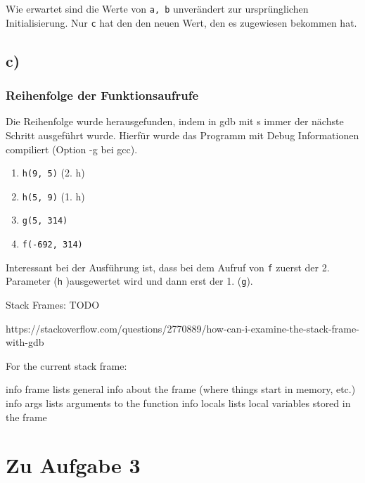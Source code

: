 \documentclass[12pt]{article}
\begin{document}
Wie erwartet sind die Werte von \texttt{a, b} unverändert zur ursprünglichen Initialisierung. Nur \texttt{c} hat den den neuen Wert, den es zugewiesen bekommen hat.

\subsection{c)}

\subsubsection{Reihenfolge der Funktionsaufrufe}

Die Reihenfolge wurde herausgefunden, indem in gdb mit s immer der nächste Schritt ausgeführt wurde. Hierfür wurde das Programm mit Debug Informationen compiliert (Option -g bei gcc).


\begin{enumerate}
\item \texttt{h(9, 5)} (2. h)
\item \texttt{h(5, 9)} (1. h)
\item \texttt{g(5, 314)}
\item \texttt{f(-692, 314)}
\end{enumerate}

Interessant bei der Ausführung ist, dass bei dem Aufruf von \texttt{f} zuerst der 2. Parameter (\texttt{h} )ausgewertet wird und dann erst der 1. (\texttt{g}).

Stack Frames: TODO

https://stackoverflow.com/questions/2770889/how-can-i-examine-the-stack-frame-with-gdb


For the current stack frame:

    info frame lists general info about the frame (where things start in memory, etc.)
    info args lists arguments to the function
    info locals lists local variables stored in the frame



















\newpage
\section{Zu Aufgabe 3}
\end{document}
